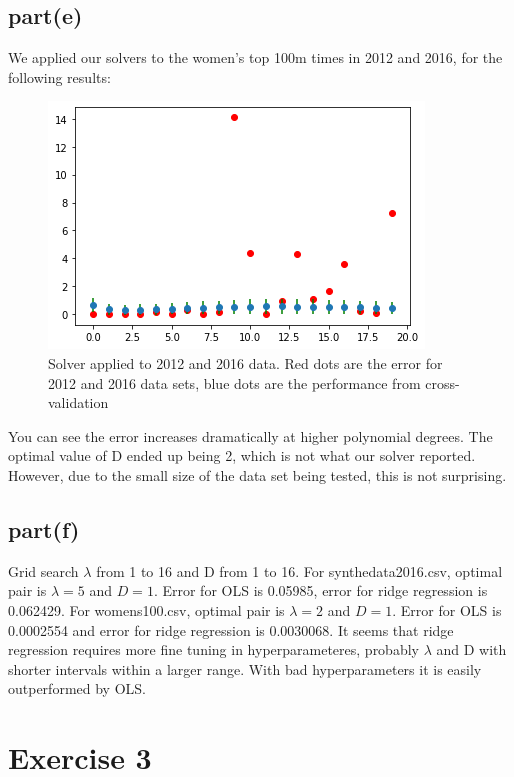 \documentclass[12pt]{amsart}
\begin{document}
\subsection*{part(e)} We applied our solvers to the women's top 100m times in 2012 and 2016, for the following results:

\begin{figure}[H]
    \centering
    \includegraphics[scale=0.8]{womenserrors.png}
    \caption{Solver applied to 2012 and 2016 data. Red dots are the error for 2012 and 2016 data sets, blue dots are the performance from cross-validation}
    \label{fig:my_label}
\end{figure}

You can see the error increases dramatically at higher polynomial degrees. The optimal value of D ended up being 2, which is not what our solver reported. However, due to the small size of the data set being tested, this is not surprising.

\subsection*{part(f)}
Grid search $\lambda$ from 1 to 16 and D from 1 to 16. For synthedata2016.csv, optimal pair is $\lambda = 5$ and $D=1$. Error for OLS is 0.05985, error for ridge regression is 0.062429. For womens100.csv, optimal pair is $\lambda = 2$ and $D=1$. Error for OLS is 0.0002554 and error for ridge regression is 0.0030068. It seems that ridge regression requires more fine tuning in hyperparameteres, probably $\lambda$ and D with shorter intervals within a larger range. With bad hyperparameters it is easily outperformed by OLS.

\newpage

\section*{Exercise 3}
\end{document}
